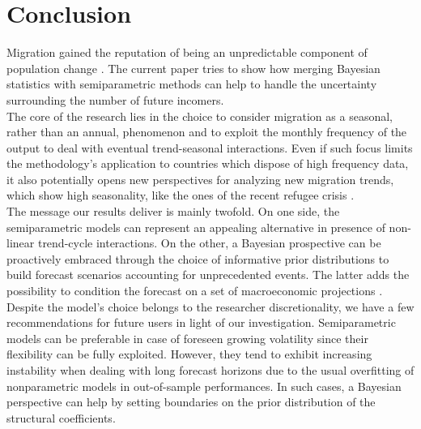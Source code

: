 \documentclass{article}\usepackage[]{graphicx}\usepackage[]{color}
\begin{document}
\section{Conclusion}\label{conclusion}
Migration gained the reputation of being an unpredictable component of population change \cite{pijpers2008problematising, bijak2010bayesian}. The current paper tries to show how merging Bayesian statistics with semiparametric methods can help to handle the uncertainty surrounding the number of future incomers. \\
The core of the research lies in the choice to consider migration as a seasonal, rather than an annual, phenomenon and to exploit the monthly frequency of the output to deal with eventual trend-seasonal interactions. Even if such focus limits the methodology's application to countries which dispose of high frequency data, it also potentially opens new perspectives for analyzing new migration trends, which show high seasonality, like the ones of the recent refugee crisis .\\
The message our results deliver is mainly twofold. On one side, the semiparametric models can represent an appealing alternative in presence of non-linear trend-cycle interactions. On the other, a Bayesian prospective can be proactively embraced through the choice of informative prior distributions to build forecast scenarios accounting for unprecedented events. The latter adds the possibility to condition the forecast on a set of macroeconomic projections \cite{bijak2010forecasting}. \\
Despite the model's choice belongs to the researcher discretionality, we have a few recommendations for future users in light of our investigation. Semiparametric models can be preferable in case of foreseen growing volatility since their flexibility can be fully exploited. However, they tend to exhibit increasing instability when dealing with long forecast horizons due to the usual overfitting of nonparametric models in out-of-sample performances. In such cases, a Bayesian perspective can help by setting boundaries on the prior distribution of the structural coefficients. 

\end{document}
